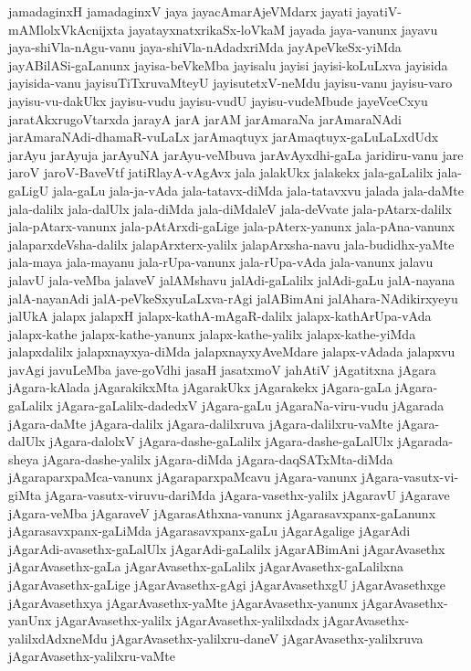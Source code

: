 {jamadaginxH
jamadaginxV
jaya
jayacAmarAjeVMdarx
jayati
jayatiV-mAMlolxVkAcnijxta
jayatayxnatxrikaSx-loVkaM
jayada
jaya-vanunx
jayavu
jaya-shiVla-nAgu-vanu
jaya-shiVla-nAdadxriMda
jayApeVkeSx-yiMda
jayABilASi-gaLanunx
jayisa-beVkeMba
jayisalu
jayisi
jayisi-koLuLxva
jayisida
jayisida-vanu
jayisuTiTxruvaMteyU
jayisutetxV-neMdu
jayisu-vanu
jayisu-varo
jayisu-vu-dakUkx
jayisu-vudu
jayisu-vudU
jayisu-vudeMbude
jayeVceCxyu
jaratAkxrugoVtarxda
jarayA
jarA
jarAM
jarAmaraNa
jarAmaraNAdi
jarAmaraNAdi-dhamaR-vuLaLx
jarAmaqtuyx
jarAmaqtuyx-gaLuLaLxdUdx
jarAyu
jarAyuja
jarAyuNA
jarAyu-veMbuva
jarAvAyxdhi-gaLa
jaridiru-vanu
jare
jaroV
jaroV-BaveVtf
jatiRlayA-vAgAvx
jala
jalakUkx
jalakekx
jala-gaLalilx
jala-gaLigU
jala-gaLu
jala-ja-vAda
jala-tatavx-diMda
jala-tatavxvu
jalada
jala-daMte
jala-dalilx
jala-dalUlx
jala-diMda
jala-diMdaleV
jala-deVvate
jala-pAtarx-dalilx
jala-pAtarx-vanunx
jala-pAtArxdi-gaLige
jala-pAterx-yanunx
jala-pAna-vanunx
jalaparxdeVsha-dalilx
jalapArxterx-yalilx
jalapArxsha-navu
jala-budidhx-yaMte
jala-maya
jala-mayanu
jala-rUpa-vanunx
jala-rUpa-vAda
jala-vanunx
jalavu
jalavU
jala-veMba
jalaveV
jalAMshavu
jalAdi-gaLalilx
jalAdi-gaLu
jalA-nayana
jalA-nayanAdi
jalA-peVkeSxyuLaLxva-rAgi
jalABimAni
jalAhara-NAdikirxyeyu
jalUkA
jalapx
jalapxH
jalapx-kathA-mAgaR-dalilx
jalapx-kathArUpa-vAda
jalapx-kathe
jalapx-kathe-yanunx
jalapx-kathe-yalilx
jalapx-kathe-yiMda
jalapxdalilx
jalapxnayxya-diMda
jalapxnayxyAveMdare
jalapx-vAdada
jalapxvu
javAgi
javuLeMba
jave-goVdhi
jasaH
jasatxmoV
jahAtiV
jAgatitxna
jAgara
jAgara-kAlada
jAgarakikxMta
jAgarakUkx
jAgarakekx
jAgara-gaLa
jAgara-gaLalilx
jAgara-gaLalilx-dadedxV
jAgara-gaLu
jAgaraNa-viru-vudu
jAgarada
jAgara-daMte
jAgara-dalilx
jAgara-dalilxruva
jAgara-dalilxru-vaMte
jAgara-dalUlx
jAgara-dalolxV
jAgara-dashe-gaLalilx
jAgara-dashe-gaLalUlx
jAgarada-sheya
jAgara-dashe-yalilx
jAgara-diMda
jAgara-daqSATxMta-diMda
jAgaraparxpaMca-vanunx
jAgaraparxpaMcavu
jAgara-vanunx
jAgara-vasutx-vi-giMta
jAgara-vasutx-viruvu-dariMda
jAgara-vasethx-yalilx
jAgaravU
jAgarave
jAgara-veMba
jAgaraveV
jAgarasAthxna-vanunx
jAgarasavxpanx-gaLanunx
jAgarasavxpanx-gaLiMda
jAgarasavxpanx-gaLu
jAgarAgalige
jAgarAdi
jAgarAdi-avasethx-gaLalUlx
jAgarAdi-gaLalilx
jAgarABimAni
jAgarAvasethx
jAgarAvasethx-gaLa
jAgarAvasethx-gaLalilx
jAgarAvasethx-gaLalilxna
jAgarAvasethx-gaLige
jAgarAvasethx-gAgi
jAgarAvasethxgU
jAgarAvasethxge
jAgarAvasethxya
jAgarAvasethx-yaMte
jAgarAvasethx-yanunx
jAgarAvasethx-yanUnx
jAgarAvasethx-yalilx
jAgarAvasethx-yalilxdadx
jAgarAvasethx-yalilxdAdxneMdu
jAgarAvasethx-yalilxru-daneV
jAgarAvasethx-yalilxruva
jAgarAvasethx-yalilxru-vaMte
}
